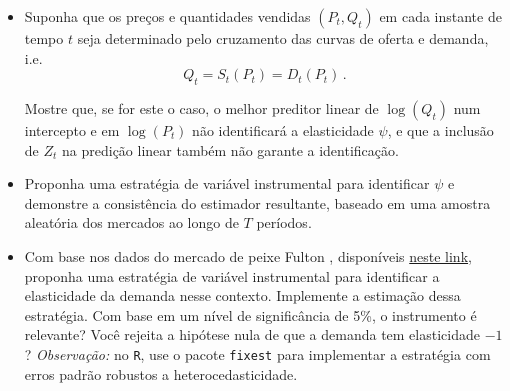 \documentclass[10pt,a4paper]{article}
\begin{document}
\begin{itemize}
	\item[a] Suponha que os preços e quantidades vendidas $(P_t,Q_t)$ em cada instante de tempo $t$ seja determinado pelo cruzamento das curvas de oferta e demanda, i.e.
	$$Q_t = S_t(P_t)= D_t(P_t)\, .$$
	
	Mostre que, se for este o caso, o melhor preditor linear de $\log(Q_t)$ num intercepto e em $\log(P_t)$ não identificará a elasticidade $\psi$, e que a inclusão de $Z_t$ na predição linear também não garante a identificação.
	
	\item[b] Proponha uma estratégia de variável instrumental para identificar $\psi$ e demonstre a consistência do estimador resultante, baseado em uma amostra aleatória dos mercados ao longo de $T$ períodos.
	
	\item[c] Com base nos dados do mercado de peixe Fulton \citep{Graddy2006}, disponíveis \href{https://users.ox.ac.uk/~nuff0078/Data/fulton.zip}{neste link}, proponha uma estratégia de variável instrumental para identificar a elasticidade da demanda nesse contexto. Implemente a estimação dessa estratégia. Com base em um nível de significância de 5\%, o instrumento é relevante? Você rejeita a hipótese nula de que a demanda tem elasticidade $-1$? \textit{Observação:} no \texttt{R}, use o pacote \texttt{fixest} para implementar a estratégia com erros padrão robustos a heterocedasticidade.
\end{itemize}
\end{document}
